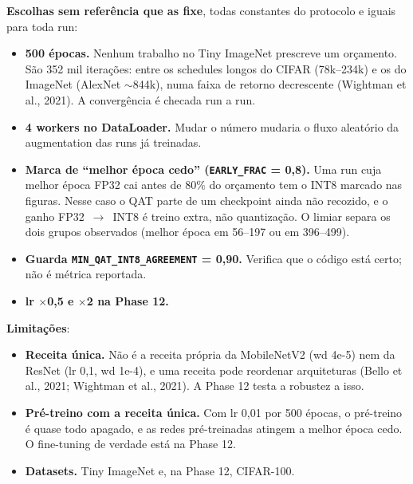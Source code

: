 \documentclass[10pt,a4paper]{article}
\newcommand{\x}{\ensuremath{\times}}
\begin{document}
\textbf{Escolhas sem referência que as fixe}, todas constantes do protocolo e iguais para toda run:
\begin{itemize}[leftmargin=1.2em,itemsep=0.25em,topsep=0.2em]
  \item \textbf{500 épocas.} Nenhum trabalho no Tiny ImageNet prescreve um orçamento. São 352 mil iterações: entre os
        schedules longos do CIFAR (78k--234k) e os do ImageNet (AlexNet $\sim$844k), numa faixa de retorno decrescente
        (Wightman et al., 2021). A convergência é checada run a run.
  \item \textbf{4 workers no DataLoader.} Mudar o número mudaria o fluxo aleatório da augmentation das runs já treinadas.
  \item \textbf{Marca de ``melhor época cedo'' (\texttt{EARLY\_FRAC} = 0,8).} Uma run cuja melhor época FP32 cai antes de
        80\% do orçamento tem o INT8 marcado nas figuras. Nesse caso o QAT parte de um checkpoint ainda não recozido, e o
        ganho FP32~$\rightarrow$~INT8 é treino extra, não quantização. O limiar separa os dois grupos observados (melhor
        época em 56--197 ou em 396--499).
  \item \textbf{Guarda \texttt{MIN\_QAT\_INT8\_AGREEMENT} = 0,90.} Verifica que o código está certo; não é métrica
        reportada.
  \item \textbf{lr \x0,5 e \x2 na Phase 12.}
\end{itemize}

\textbf{Limitações}:
\begin{itemize}[leftmargin=1.2em,itemsep=0.25em,topsep=0.2em]
  \item \textbf{Receita única.} Não é a receita própria da MobileNetV2 (wd 4e-5) nem da ResNet (lr 0,1, wd 1e-4), e uma
        receita pode reordenar arquiteturas (Bello et al., 2021; Wightman et al., 2021). A Phase 12 testa a robustez a isso.
  \item \textbf{Pré-treino com a receita única.} Com lr 0,01 por 500 épocas, o pré-treino é quase todo apagado, e as
        redes pré-treinadas atingem a melhor época cedo. O fine-tuning de verdade está na Phase 12.
  \item \textbf{Datasets.} Tiny ImageNet e, na Phase 12, CIFAR-100.
\end{itemize}

\end{document}
